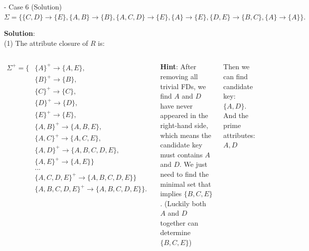 \begin{frame}[fragile]{ - Case 6 (Solution)}
	$\Sigma=\{\{C,D\} \rightarrow \{E\},\{A,B\} \rightarrow \{B\}, \{A,C,D\} \rightarrow \{E\},\{A\} \rightarrow \{E\},\{D,E\} \rightarrow \{B,C\},\{A\} \rightarrow \{A\}\}.$\\\vspace{5pt}
	
	\textbf{Solution}:\\
	(1) The attribute closure of $R$ is:
	\vspace{-10pt}\begin{columns}
	\begin{scriptsize}\begin{align*} 
		\Sigma^{+} = \{&\{A\}^{+} \rightarrow \{A,E\},\\
		&\{B\}^{+} \rightarrow \{B\},\\
		&\{C\}^{+} \rightarrow \{C\},\\
		&\{D\}^{+} \rightarrow \{D\},\\
		&\{E\}^{+} \rightarrow \{E\},\\
		&\{A,B\}^{+} \rightarrow \{A,B,E\},\\
		&\{A,C\}^{+} \rightarrow \{A,C,E\},\\
		&\{A,D\}^{+} \rightarrow \{A,B,C,D,E\},\\
		&\{A,E\}^{+} \rightarrow \{A,E\}\}\\
		& ...\\
		&\{A,C,D,E\}^{+} \rightarrow \{A,B,C,D,E\}\}\\
		&\{A,B,C,D,E\}^{+} \rightarrow \{A,B,C,D,E\}\}.
	\end{align*}\end{scriptsize} 
	
	\textbf{Hint}: 
	After removing all trivial FDs, we find $A$ and $D$ have never appeared in the right-hand side, which means the candidate key must contains $A$ and $D$. We just need to find the minimal set that implies $\{B,C,E\}$. (Luckily both $A$ and $D$ together can determine $\{B,C,E\}$)\\\vspace{3pt}

	Then we can find candidate key: $\{A,D\}$. And the prime attributes: $A, D$
	\end{columns}
	
\end{frame}

